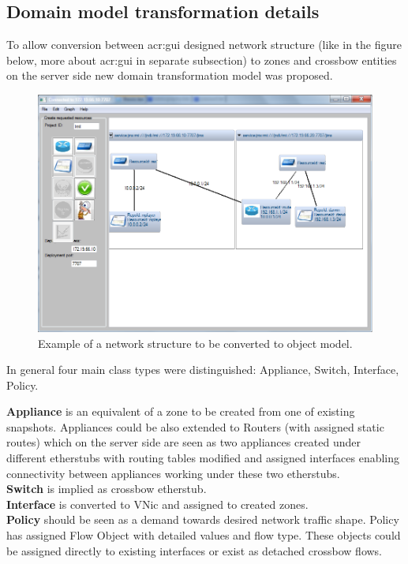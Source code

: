 \documentclass[11pt]{book}
\begin{document}
			\noindent
			\begin{minipage}{\textwidth}
				
			\end{minipage}


		\subsection{Domain model transformation details}
			\label{sec:impl:model}

		To allow conversion between \gls{acr:gui} designed network structure (like in the figure below, more about \gls{acr:gui} in separate subsection) to
                zones and crossbow entities on the server side new domain transformation model was proposed. 
      
		\begin{figure}[H]
			\begin{center}
			\includegraphics[width=1.0\textwidth]{img/impl/network_structure_example.png}
			\end{center}
			\caption{Example of a network structure to be converted to object model.}
		\end{figure} 

		In general four main class types were distinguished: Appliance, Switch, Interface, Policy.

		\medskip

		\textbf{Appliance} is an equivalent of a zone to be created from one of existing snapshots. Appliances could be
		also extended to Routers (with assigned static routes) which on the server side are seen as two appliances created
		under different etherstubs with routing tables modified and assigned interfaces enabling connectivity between
		appliances working under these two etherstubs. \\
		\textbf{Switch} is implied as crossbow etherstub. \\
		\textbf{Interface} is converted to VNic and assigned to created zones. \\
		\textbf{Policy} should be seen as a demand towards desired network traffic shape. Policy has assigned Flow Object
		with detailed values and flow type. These objects could be assigned directly to existing interfaces or exist as
		detached crossbow flows.
\end{document}
